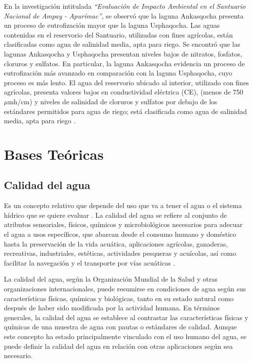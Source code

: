 En la investigación intitulada \textit{``Evaluación de Impacto Ambiental en el Santuario Nacional de Ampay - Apurímac''}, se observó que la laguna Ankasqocha presenta un proceso de eutrofización mayor que la laguna Usphaqocha. Las aguas contenidas en el reservorio del Santuario, utilizadas con fines agrícolas, están clasificadas como agua de salinidad media, apta para riego. Se encontró que las lagunas Ankasqocha y Usphaqocha presentan niveles bajos de nitratos, fosfatos, cloruros y sulfatos. En particular, la laguna Ankasqocha evidencia un proceso de eutrofización más avanzado en comparación con la laguna Usphaqocha, cuyo proceso es más lento. El agua del reservorio ubicado al interior, utilizado con fines agrícolas, presenta valores bajos en conductividad eléctrica (CE), (menos de 750 $\mu$mh\slash cm) y niveles de salinidad de cloruros y sulfatos por debajo de los estándares permitidos para agua de riego; está clasificada como agua de salinidad media, apta para riego \cite{martinez2011}.


\section{Bases Teóricas}
\subsection{Calidad del agua }
Es un concepto relativo que depende del uso que va a tener el agua o el sistema hídrico que se quiere evaluar \cite{Sierra2011}. La calidad del agua se refiere al conjunto de atributos sensoriales, físicos, químicos y microbiológicos necesarios para adecuar el agua a usos específicos, que abarcan desde el consumo humano y doméstico hasta la preservación de la vida acuática, aplicaciones agrícolas, ganaderas, recreativas, industriales, estéticas, actividades pesqueras y acuícolas, así como facilitar la navegación y el transporte por vías acuáticas \cite{Lozano2013}.

La calidad del agua, según la Organización Mundial de la Salud y otras organizaciones internacionales, puede resumirse en condiciones de agua según sus características físicas, químicas y biológicas, tanto en su estado natural como después de haber sido modificada por la actividad humana. En términos generales, la calidad del agua se establece al contrastar las características físicas y químicas de una muestra de agua con pautas o estándares de calidad. Aunque este concepto ha estado principalmente vinculado con el uso humano del agua, se puede definir la calidad del agua en relación con otras aplicaciones según sea necesario.

